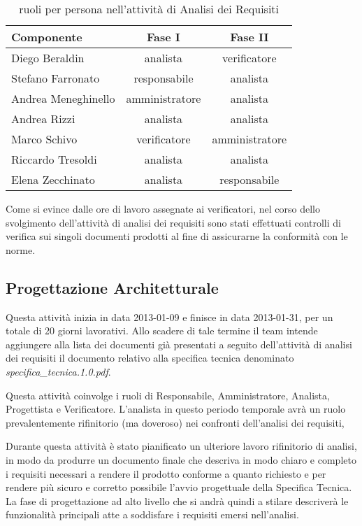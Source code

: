 \begin{table}[h!]
\centering
\begin{tabular}{|l|c|c|}
\hline
Componente& Fase I&Fase II\\
\hline
Diego Beraldin & analista&verificatore\\
Stefano Farronato & responsabile&analista\\
Andrea Meneghinello & amministratore&analista\\
Andrea Rizzi &  analista&analista\\
Marco Schivo & verificatore&amministratore\\
Riccardo Tresoldi & analista&analista\\
Elena Zecchinato & analista&responsabile\\
\hline
\end{tabular}
\caption{ruoli per persona nell'attività di Analisi dei Requisiti}\label{tab:ruolian3}
\end{table}

Come si evince dalle ore di lavoro assegnate ai verificatori, nel corso dello svolgimento dell'attività di analisi dei requisiti sono stati effettuati controlli di verifica sui singoli documenti prodotti al fine di assicurarne la conformità con le norme.
\clearpage

\subsection{Progettazione Architetturale}
Questa attività inizia in data 2013-01-09 e finisce in data 2013-01-31, per un totale di 20 giorni lavorativi. Allo scadere di tale termine il team intende aggiungere alla lista dei documenti già presentati a seguito dell'attività di analisi dei requisiti il documento relativo alla specifica tecnica denominato \textit{specifica\_tecnica.1.0.pdf}.

Questa attività coinvolge i ruoli di Responsabile, Amministratore, Analista, Progettista e Verificatore.
L'analista in questo periodo temporale avrà un ruolo prevalentemente rifinitorio (ma doveroso) nei confronti dell'analisi dei requisiti, 

Durante questa attività è stato pianificato un ulteriore lavoro rifinitorio di analisi, in modo da produrre un documento finale che descriva in modo chiaro e completo i requisiti necessari a rendere il prodotto conforme a quanto richiesto e per rendere più sicuro e corretto possibile l'avvio progettuale della Specifica Tecnica.
La fase di progettazione ad alto livello che si andrà quindi a stilare descriverà le funzionalità principali atte a soddisfare i requisiti emersi nell'analisi.


